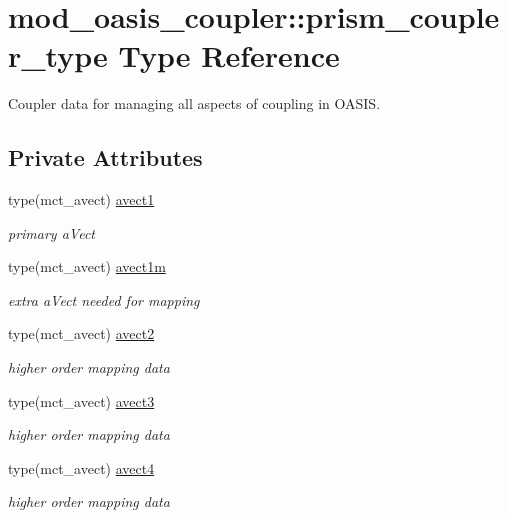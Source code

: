 \hypertarget{structmod__oasis__coupler_1_1prism__coupler__type}{}\section{mod\+\_\+oasis\+\_\+coupler\+:\+:prism\+\_\+coupler\+\_\+type Type Reference}
\label{structmod__oasis__coupler_1_1prism__coupler__type}


Coupler data for managing all aspects of coupling in O\+A\+S\+IS.  


\subsection*{Private Attributes}
\begin{DoxyCompactItemize}
\item 
type(mct\+\_\+avect) \hyperlink{structmod__oasis__coupler_1_1prism__coupler__type_a153e0bf9e28c0a8ff4d8bb27c83f598e}{avect1}
\begin{DoxyCompactList}\small\item\em primary a\+Vect \end{DoxyCompactList}\item 
type(mct\+\_\+avect) \hyperlink{structmod__oasis__coupler_1_1prism__coupler__type_ab5626722caee601622658134916f12bf}{avect1m}
\begin{DoxyCompactList}\small\item\em extra a\+Vect needed for mapping \end{DoxyCompactList}\item 
type(mct\+\_\+avect) \hyperlink{structmod__oasis__coupler_1_1prism__coupler__type_a7cd1aa8e520cf036f4dd72ad2445b774}{avect2}
\begin{DoxyCompactList}\small\item\em higher order mapping data \end{DoxyCompactList}\item 
type(mct\+\_\+avect) \hyperlink{structmod__oasis__coupler_1_1prism__coupler__type_ac923618471bb31902062be4107d9bbf3}{avect3}
\begin{DoxyCompactList}\small\item\em higher order mapping data \end{DoxyCompactList}\item 
type(mct\+\_\+avect) \hyperlink{structmod__oasis__coupler_1_1prism__coupler__type_a478dda1acb9e270efda23a7275b21b83}{avect4}
\begin{DoxyCompactList}\small\item\em higher order mapping data \end{DoxyCompactList}\item 

\end{DoxyCompactItemize}
